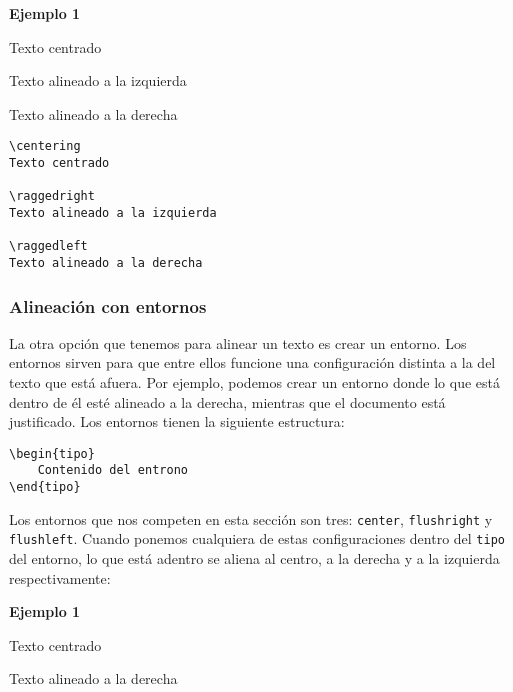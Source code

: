 	\textbf{Ejemplo 1}
	
	\begin{minipage}{\textwidth}
		\centering		
		Texto centrado
				
		\raggedright
		Texto alineado a la izquierda
			
		\raggedleft
		Texto alineado a la derecha
	\end{minipage}

	\begin{myquote}
		\begin{lstlisting}
\centering		
Texto centrado
	
\raggedright
Texto alineado a la izquierda
	
\raggedleft
Texto alineado a la derecha
		\end{lstlisting}
	\end{myquote}
	
	
	\subsubsection{Alineación con entornos}
	
	La otra opción que tenemos para alinear un texto es crear un entorno. Los entornos sirven para que entre ellos funcione una configuración distinta a la del texto que está afuera. Por ejemplo, podemos crear un entorno donde lo que está dentro de él esté alineado a la derecha, mientras que el documento está justificado. Los entornos tienen la siguiente estructura:
	
	\begin{myquote}
		\begin{lstlisting}
\begin{tipo}
	Contenido del entrono
\end{tipo}
		\end{lstlisting}
	\end{myquote}
	
	
	Los entornos que nos competen en esta sección son tres: \texttt{center}, \texttt{flushright} y \texttt{flushleft}. Cuando ponemos cualquiera de estas configuraciones dentro del \texttt{tipo} del entorno, lo que está adentro se aliena al centro, a la derecha y a la izquierda respectivamente:
	
	\textbf{Ejemplo 1}
	
	\begin{center}
		Texto centrado
	\end{center}

	\begin{flushright}
		Texto alineado a la derecha
	\end{flushright}

